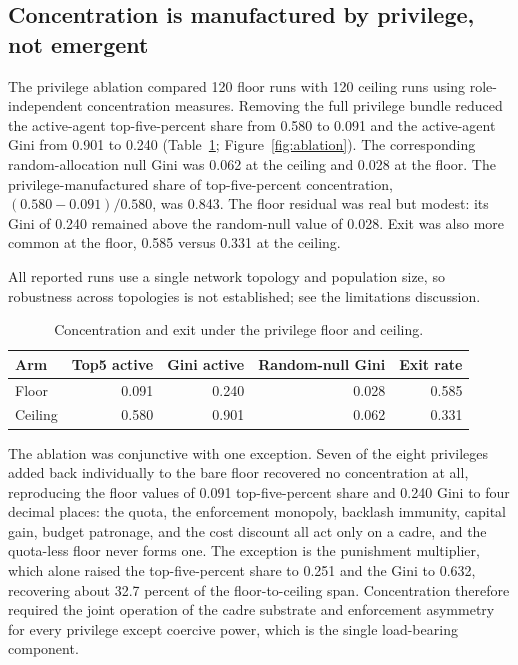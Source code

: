 \documentclass[12pt]{article}
\begin{document}
\subsection{Concentration is manufactured by privilege, not emergent}

The privilege ablation compared 120 floor runs with 120 ceiling runs using role-independent concentration measures. Removing the full privilege bundle reduced the active-agent top-five-percent share from 0.580 to 0.091 and the active-agent Gini from 0.901 to 0.240 (Table~\ref{tab:privilege-ablation}; Figure~\ref{fig:ablation}). The corresponding random-allocation null Gini was 0.062 at the ceiling and 0.028 at the floor. The privilege-manufactured share of top-five-percent concentration, $(0.580-0.091)/0.580$, was 0.843. The floor residual was real but modest: its Gini of 0.240 remained above the random-null value of 0.028. Exit was also more common at the floor, 0.585 versus 0.331 at the ceiling.

All reported runs use a single network topology and population size, so robustness across topologies is not established; see the limitations discussion.

\begin{table}[htbp]
\centering
\caption{Concentration and exit under the privilege floor and ceiling.}
\label{tab:privilege-ablation}
\begin{tabular}{lrrrr}
\hline
Arm & Top5 active & Gini active & Random-null Gini & Exit rate \\
\hline
Floor & 0.091 & 0.240 & 0.028 & 0.585 \\
Ceiling & 0.580 & 0.901 & 0.062 & 0.331 \\
\hline
\end{tabular}
\end{table}

The ablation was conjunctive with one exception. Seven of the eight privileges added back individually to the bare floor recovered no concentration at all, reproducing the floor values of 0.091 top-five-percent share and 0.240 Gini to four decimal places: the quota, the enforcement monopoly, backlash immunity, capital gain, budget patronage, and the cost discount all act only on a cadre, and the quota-less floor never forms one. The exception is the punishment multiplier, which alone raised the top-five-percent share to 0.251 and the Gini to 0.632, recovering about 32.7 percent of the floor-to-ceiling span. Concentration therefore required the joint operation of the cadre substrate and enforcement asymmetry for every privilege except coercive power, which is the single load-bearing component.
\end{document}
